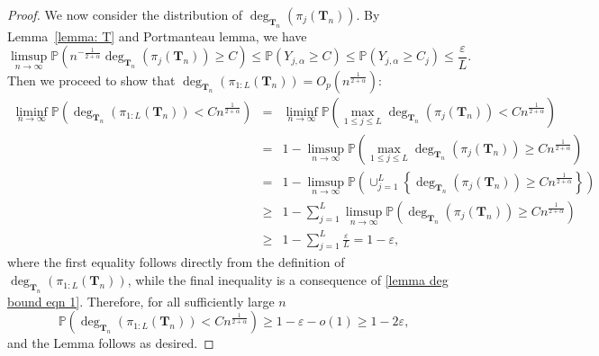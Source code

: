 \documentclass[twoside,11pt]{article}
\theoremstyle{remark}
\begin{document}
\begin{proof}
We now consider the distribution of $\operatorname{deg}_{\boldsymbol{T}_n}\left(\pi_{j}\left(\boldsymbol{T}_n\right)\right)$. By  Lemma~\ref{lemma: T} and Portmanteau lemma, we have
%
\begin{equation}
\label{lemma deg bound eqn 1}
    \limsup_{n\rightarrow \infty}\mathbb{P}\left(n^{-\frac{1}{2+\alpha}}\operatorname{deg}_{\boldsymbol{T}_n}\left(\pi_j\left(\boldsymbol{T}_n\right)\right)\geq C\right)\le \mathbb{P}\left(Y_{j, \alpha} \geq C\right)\le \mathbb{P}\left(Y_{j, \alpha}\geq  C_j\right)\le \frac{\varepsilon}{L}.
\end{equation}
%
Then we proceed to show that $\operatorname{deg}_{\boldsymbol{T}_n}\left(\pi_{1:L}\left(\boldsymbol{T}_n\right)\right)=O_p\left(n^{\frac{1}{2+\alpha}}\right)$:
%
\begingroup
\begin{eqnarray*}
\liminf_{n\rightarrow \infty}\mathbb{P}\left(\operatorname{deg}_{\boldsymbol{T}_n}\left(\pi_{1:L}\left(\boldsymbol{T}_n\right)\right)< Cn^{\frac{1}{2+\alpha}}\right) &=& \liminf_{n\rightarrow \infty}\mathbb{P}\left(\max_{1\le j\le L}\operatorname{deg}_{\boldsymbol{T}_n}\left(\pi_{j}\left(\boldsymbol{T}_n\right)\right)< Cn^{\frac{1}{2+\alpha}}\right)  \\
&=& 1-\limsup_{n\rightarrow \infty}\mathbb{P}\left(\max_{1\le j\le L}\operatorname{deg}_{\boldsymbol{T}_n}\left(\pi_{j}\left(\boldsymbol{T}_n\right)\right)\geq  Cn^{\frac{1}{2+\alpha}}\right)\\
&=& 1-\limsup_{n\rightarrow \infty}\mathbb{P}\left(\cup^L_{j=1}\left\{\operatorname{deg}_{\boldsymbol{T}_n}\left(\pi_{j}\left(\boldsymbol{T}_n\right)\right)\geq Cn^{\frac{1}{2+\alpha}}\right\}\right)\\
&\ge & 1-\sum_{j=1}^L \limsup_{n\rightarrow \infty}\mathbb{P}\left(\operatorname{deg}_{\boldsymbol{T}_n}\left(\pi_{j}\left(\boldsymbol{T}_n\right)\right)\geq  Cn^{\frac{1}{2+\alpha}}\right)\\
&\ge &1-\sum_{j=1}^L \frac{\varepsilon}{L}=1-\varepsilon,
\end{eqnarray*}
\endgroup
%
where the first equality follows directly from the definition of $\deg_{\boldsymbol{T}_n}\left(\pi_{1:L}(\boldsymbol{T}_n)\right)$, while the final inequality is a consequence of \eqref{lemma deg bound eqn 1}.
Therefore, for all sufficiently large $n$
%
\begin{equation*}
\mathbb{P}\left(\operatorname{deg}_{\boldsymbol{T}_n}\left(\pi_{1:L}\left(\boldsymbol{T}_n\right)\right)< Cn^{\frac{1}{2+\alpha}}\right)\geq 1-\varepsilon-o\left(1\right)\ge 1-2\varepsilon,    
\end{equation*}
%
and the Lemma follows as desired.
\end{proof}
\end{document}
